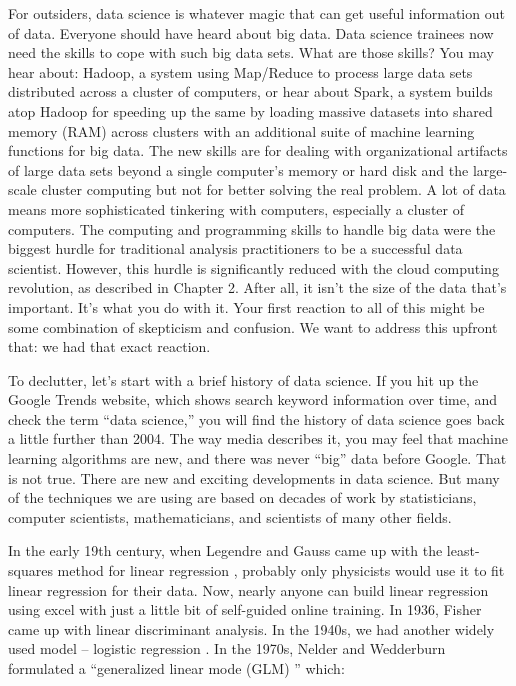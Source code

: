 \documentclass[12pt,]{krantz}
\begin{document}
For outsiders, data science is whatever magic that can get useful information out of data. Everyone should have heard about big data. Data science trainees now need the skills to cope with such big data sets. What are those skills? You may hear about: Hadoop, a system using Map/Reduce to process large data sets distributed across a cluster of computers, or hear about Spark, a system builds atop Hadoop for speeding up the same by loading massive datasets into shared memory (RAM) across clusters with an additional suite of machine learning functions for big data. The new skills are for dealing with organizational artifacts of large data sets beyond a single computer's memory or hard disk and the large-scale cluster computing but not for better solving the real problem. A lot of data means more sophisticated tinkering with computers, especially a cluster of computers. The computing and programming skills to handle big data were the biggest hurdle for traditional analysis practitioners to be a successful data scientist. However, this hurdle is significantly reduced with the cloud computing revolution, as described in Chapter 2. After all, it isn't the size of the data that's important. It's what you do with it. Your first reaction to all of this might be some combination of skepticism and confusion. We want to address this upfront that: we had that exact reaction.

To declutter, let's start with a brief history of data science. If you hit up the Google Trends website, which shows search keyword information over time, and check the term ``data science,'' you will find the history of data science goes back a little further than 2004. The way media describes it, you may feel that machine learning algorithms are new, and there was never ``big'' data before Google. That is not true. There are new and exciting developments in data science. But many of the techniques we are using are based on decades of work by statisticians, computer scientists, mathematicians, and scientists of many other fields.

In the early 19th century, when Legendre and Gauss came up with the least-squares method for linear regression , probably only physicists would use it to fit linear regression for their data. Now, nearly anyone can build linear regression using excel with just a little bit of self-guided online training. In 1936, Fisher came up with linear discriminant analysis. In the 1940s, we had another widely used model -- logistic regression . In the 1970s, Nelder and Wedderburn formulated a ``generalized linear mode (GLM)  '' which:
\end{document}
